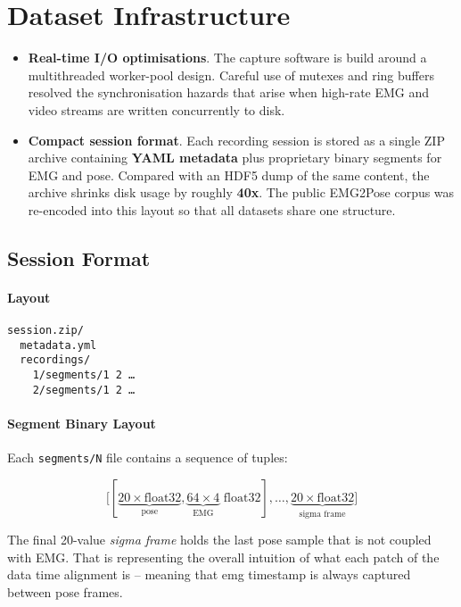 \section{Dataset Infrastructure}
\begin{itemize}
    \item \textbf{Real-time I/O optimisations}.
          The capture software is build around a multithreaded
          worker-pool design. Careful use of mutexes and ring buffers resolved
          the synchronisation hazards that arise when high-rate EMG and video
          streams are written concurrently to disk.
    \item \textbf{Compact session format}.
          Each recording session is stored as a single ZIP archive containing
          \textbf{YAML metadata} plus proprietary binary segments for EMG and
          pose. Compared with an HDF5 dump of the same content, the archive
          shrinks disk usage by roughly \textbf{40x}. The public EMG2Pose
          corpus was re-encoded into this layout so that all datasets share one
          structure.
\end{itemize}

\subsection{Session Format}

\paragraph{Layout}

\begin{verbatim}
session.zip/
  metadata.yml
  recordings/
    1/segments/1 2 …
    2/segments/1 2 …
\end{verbatim}

\paragraph{Segment Binary Layout}

Each \texttt{segments/N} file contains a sequence of tuples:

\[
\bigl[
  [\underbrace{20\! \times\! \text{float32}}_{\text{pose}},
   \underbrace{64\!\times\!4}_{\text{EMG}}\text{ float32}],
  \dots,
  \underbrace{20\! \times\! \text{float32}}_{\text{sigma frame}}
\bigr]
\]

The final 20-value \emph{sigma frame} holds the last pose sample that is not coupled with EMG. That is representing the overall intuition of what each patch of the data time alignment is -- meaning that emg timestamp is always captured between pose frames.

